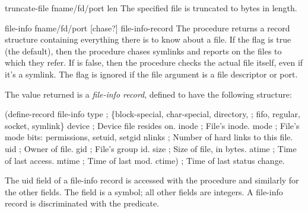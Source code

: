 \begin{defundesc} {truncate-file} {fname/fd/port len} \undefined
    The specified file is truncated to  bytes in length.
\end{defundesc}

\begin{defundesc}{file-info} {fname/fd/port [chase?]} {file-info-record}
    The  procedure
    returns a record structure containing everything
    there is to know about a file. If the  flag is true
    (the default), then the procedure chases symlinks and reports on
    the files to which they refer. If  is false, then 
    the procedure checks the actual file itself, even if it's a symlink.
    The  flag is ignored if the file argument is a file descriptor
    or port.

    The value returned is a \emph{file-info record}, defined to have the
    following structure:
\begin{code}
(define-record file-info
  type      ; \{block-special, char-special, directory,
            ;     fifo, regular, socket, symlink\}
  device    ; Device file resides on.
  inode     ; File's inode.
  mode      ; File's mode bits: permissions, setuid, setgid
  nlinks    ; Number of hard links to this file.
  uid       ; Owner of file.
  gid       ; File's group id.
  size      ; Size of file, in bytes.
  atime     ; Time of last access.
  mtime     ; Time of last mod.
  ctime)    ; Time of last status change.\end{code}
%
%
%
%
%
    The uid field of a file-info record is accessed with the procedure
    and similarly for the other fields. 
    The  field is a symbol; all other fields are integers.
    A file-info record is discriminated with the  predicate.


\end{defundesc}
